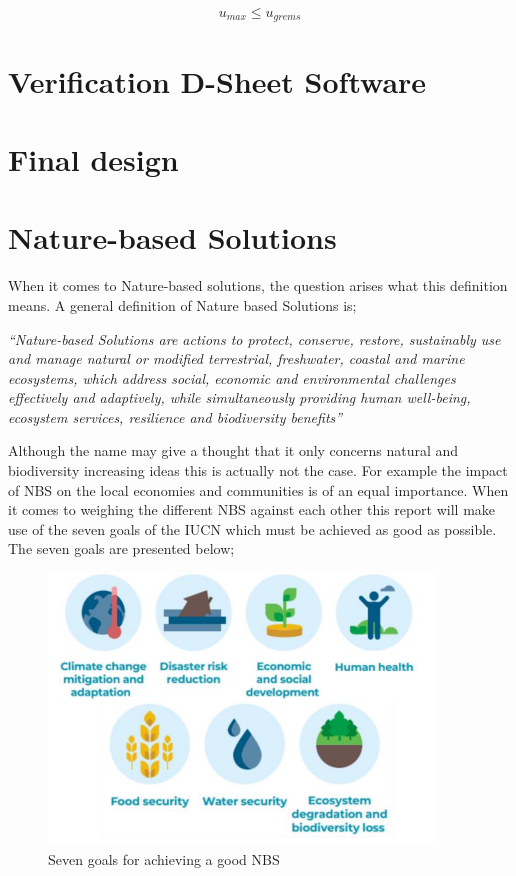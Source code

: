 \begin{equation}
    u_{max} \leq u_{grems}
\end{equation}

\section{Verification D-Sheet Software}

\section{Final design}

\newpage

\section{Nature-based Solutions}

When it comes to Nature-based solutions, the question arises what this definition means. A general definition of Nature based Solutions is;

\textit{“Nature-based Solutions are actions to protect, conserve, restore, sustainably
use and manage natural or modified terrestrial, freshwater, coastal and marine
ecosystems, which address social, economic and environmental challenges
effectively and adaptively, while simultaneously providing human well-being,
ecosystem services, resilience and biodiversity benefits” \autocite{eiselinVerenigdeNatiesStemmen2022}}

Although the name may give a thought that it only concerns natural and biodiversity increasing ideas this is actually not the case. For example the impact of NBS on the local economies and communities is of an equal importance. When it comes to weighing the different NBS against each other this report will make use of the seven goals of the IUCN which must be achieved as good as possible. The seven goals are presented below;

\begin{figure}[H]
    \centering
    \includegraphics[width=0.50\linewidth]{figures/ThesevenNBSgoals.png}
    \caption{Seven goals for achieving a good NBS \autocite{.....}}
    \label{fig:7g}
\end{figure}

